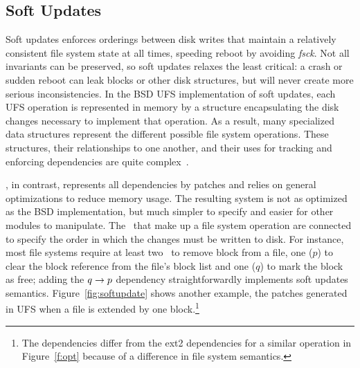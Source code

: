 \subsection{Soft Updates}
\label{sec:using:softupdate}

%
Soft updates enforces orderings between disk writes that maintain
a relatively consistent file system state at all times, speeding reboot
by avoiding \emph{fsck}.
%
Not all invariants can be preserved, so soft updates relaxes the least
critical: a crash or sudden reboot can leak blocks or other disk
structures, but will never create more serious inconsistencies.
%
%
%
In the BSD UFS implementation of soft updates, each UFS operation is
represented in memory by a structure encapsulating the disk changes
necessary to implement that operation. As a result, many
specialized data structures represent the different possible file system
operations. These structures, their relationships to one another, and their uses
for tracking and enforcing dependencies are quite
complex~\cite{mckusick99soft}.

\Kudos, in contrast, represents all dependencies by patches and relies on
general optimizations to reduce memory usage.
%
The resulting system is not as optimized as the BSD implementation, but
much simpler to specify and easier for other modules to manipulate.
%
The \chdescs\ that make up a file system operation are connected to specify
the order in which the changes must be written to disk.
%
For instance, most file systems require at least two \patches\ to remove
block from a file, one ($p$) to clear the block reference from the file's
block list and one ($q$) to mark the block as free; adding the $q \rightarrow
p$ dependency straightforwardly implements soft updates semantics.
%
Figure~\ref{fig:softupdate} shows another example, the patches generated in
UFS when a file is extended by one block.\footnote{The dependencies differ
from the ext2 dependencies for a similar operation in Figure~\ref{f:opt}
because of a difference in file system semantics.}

